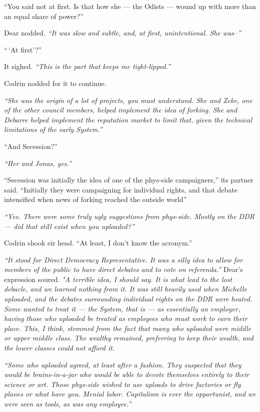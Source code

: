``You said not at first. Is that how she — the Odists — wound up with more than an equal share of power?''

Dear nodded. \emph{``It was slow and subtle, and, at first, unintentional. She was--''}

``\,`At first'?''

It sighed. \emph{``This is the part that keeps me tight-lipped.''}

Codrin nodded for it to continue.

\emph{``She was the origin of a lot of projects, you must understand. She and Zeke, one of the other council members, helped implement the idea of forking. She and Debarre helped implement the reputation market to limit that, given the technical limitations of the early System.''}

``And Secession?''

\emph{``Her and Jonas, yes.''}

``Secession was initially the idea of one of the phys-side campaigners,'' its partner said. ``Initially they were campaigning for individual rights, and that debate intensified when news of forking reached the outside world''

\emph{``Yes. There were some truly ugly suggestions from phys-side. Mostly on the DDR — did that still exist when you uploaded?''}

Codrin shook eir head. ``At least, I don't know the acronym.''

\emph{``It stood for Direct Democracy Representative. It was a silly idea to allow for members of the public to have direct debates and to vote on referenda.''} Dear's expression soured. \emph{"A terrible idea, I should say. It is what lead to the lost debacle, and we learned nothing from it. It was still heavily used when Michelle uploaded, and the debates surrounding individual rights on the DDR were heated. Some wanted to treat it — the System, that is — as essentially an employer, having those who uploaded be treated as employees who must work to earn their place. This, I think, stemmed from the fact that many who uploaded were middle or upper middle class. The wealthy remained, preferring to keep their wealth, and the lower classes could not afford it.}

\emph{``Some who uploaded agreed, at least after a fashion. They suspected that they would be brains-in-a-jar who would be able to devote themselves entirely to their science or art. Those phys-side wished to use uploads to drive factories or fly planes or what have you. Menial labor. Capitalism is ever the opportunist, and we were seen as tools, as was any employee.''}

